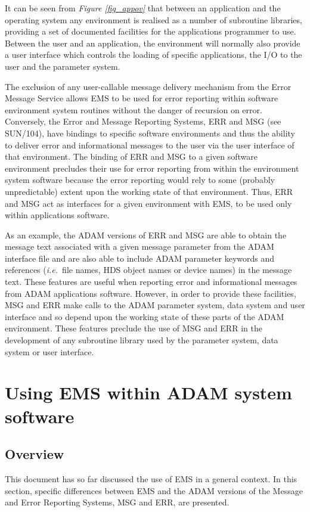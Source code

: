 \documentclass[twoside,11pt]{article}
\newcommand{\latex}[1]{#1}
\newcommand{\xref}[3]{#1}
\newcommand{\xlabel}[1]{}
\renewcommand{\_}{\texttt{\symbol{95}}}
\begin{document}
It can be seen from \textit{Figure \ref{fig_appov}} that between an application
and the
operating system any environment is realised as a number of subroutine
libraries, providing a set of documented facilities for the applications
programmer to use.
Between the user and an application, the environment will normally also 
provide a user interface which controls the loading of specific applications,
the I/O to the user and the parameter system.

The exclusion of any user-callable message delivery mechanism from the Error
Message Service allows EMS to be used for error reporting within software
environment system routines without the danger of recursion on error.
Conversely, the Error and Message Reporting Systems, 
\xref{ERR and MSG}{sun104}{}\latex{ (see SUN/104)}, 
have bindings to specific software environments and thus the ability to 
deliver error and informational messages to the user via the user interface 
of that environment.
The binding of ERR and MSG to a given software environment precludes their use
for error reporting from within the environment system software because the
error reporting would rely to some (probably unpredictable) extent upon the 
working state of that environment.
Thus, ERR and MSG act as interfaces for a given environment with EMS, to be 
used only within applications software.

As an example, the 
\xref{ADAM}{sg4}{}
versions of ERR and MSG are able to obtain the message text associated with a 
given message parameter from the ADAM interface file and are also able to 
include ADAM parameter keywords and references (\textit{i.e.}\ file names, 
\xref{HDS}{sun92}{}
object names or device names) in the message text.
These features are useful when reporting error and informational messages 
from ADAM applications software. 
However, in order to provide these facilities, MSG and ERR make calls to the
ADAM parameter system, data system and user interface and so depend
upon the working state of these parts of the ADAM environment.
These features preclude the use of MSG and ERR in the development of any 
subroutine library used by the parameter system, data system or user interface.

\newpage
\section{\xlabel{using_ems_within_adam_system_software}Using EMS within ADAM
system software} \label{ADAM_sect}
\subsection{\xlabel{ems_in_adam_overview}Overview}
This document has so far discussed the use of EMS in a general context. 
In this section, specific differences between EMS and the ADAM versions of
the Message and Error Reporting Systems, MSG and ERR, are presented.
\end{document}
